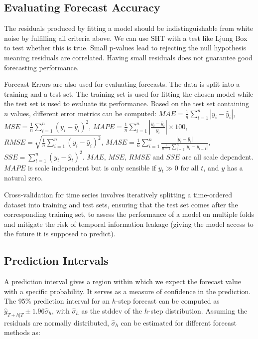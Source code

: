 \subsection{Evaluating Forecast Accuracy}
The residuals produced by fitting a model should be indistinguishable from white noise by fulfilling all criteria above.
We can use SHT with a test like Ljung Box to test whether this is true.
Small p-values lead to rejecting the null hypothesis meaning residuals are correlated.
Having small residuals does not guarantee good forecasting performance.

Forecast Errors are also used for evaluating forecasts. The data is split into a training and a test set.
The training set is used for fitting the chosen model while the test set is used to evaluate its performance.
Based on the test set containing $ n $ values, different error metrics can be computed:
$ MAE = \frac{1}{n} \sum_{i=1}^{n} |y_i - \hat{y}_i| $,
$ MSE = \frac{1}{n} \sum_{i=1}^{n} (y_i - \hat{y}_i)^2 $,
$ MAPE = \frac{1}{n} \sum_{i=1}^{n} \left| \frac{y_i - \hat{y}_i}{y_i} \right| \times 100 $,
$ RMSE = \sqrt{\frac{1}{n} \sum_{i=1}^{n} (y_i - \hat{y}_i)^2} $,
$ MASE = \frac{1}{n} \sum_{i=1}^{n} \frac{|y_i - \hat{y}_i|}{\frac{1}{n-1} \sum_{i=2}^{n} |y_i - y_{i-1}|} $,
$ SSE = \sum_{t=1}^{n} (y_t - \hat{y}_t)^2 $.
$ MAE $, $ MSE $, $ RMSE $ and $ SSE $ are all scale dependent.
$ MAPE $ is scale independent but is only sensible if $ y_t \gg 0 \text{ for all } t $, and $ y $ has a natural zero.

Cross-validation for time series involves iteratively splitting a time-ordered dataset into training and test sets,
ensuring that the test set comes after the corresponding training set,
to assess the performance of a model on multiple folds and mitigate the risk of temporal information leakage
(giving the model access to the future it is supposed to predict).

\subsection{Prediction Intervals}
A prediction interval gives a region within which we expect the forecast value with a specific probability.
It serves as a measure of confidence in the prediction. The 95\% prediction interval for an $ h $-step forecast can be computed
as $ \hat{y}_{T+h|T} \pm 1.96 \hat{\sigma}_h $, with $ \hat{\sigma}_h $ as the stddev of the $ h $-step distribution.
Assuming the residuals are normally distributed, $ \hat{\sigma}_h $ can be estimated for different forecast methods as:

